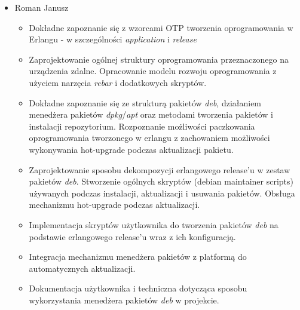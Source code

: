 \documentclass[polish,12pt]{aghthesis}
\begin{document}
\begin{itemize}
  \item Roman Janusz
  \begin{itemize}
    \item Dokładne zapoznanie się z wzorcami OTP tworzenia oprogramowania w Erlangu - w szczególności \emph{application} i \emph{release}
    \item Zaprojektowanie ogólnej struktury oprogramowania przeznaczonego na urządzenia zdalne. Opracowanie modelu rozwoju oprogramowania z użyciem narzęcia \emph{rebar} i dodatkowych skryptów.
    \item Dokładne zapoznanie się ze strukturą pakietów \emph{deb}, działaniem menedżera pakietów \emph{dpkg}/\emph{apt} oraz metodami tworzenia pakietów i instalacji repozytorium. Rozpoznanie możliwości paczkowania oprogramowania tworzonego w erlangu z zachowaniem możliwości wykonywania hot-upgrade podczas aktualizacji pakietu.
    \item Zaprojektowanie sposobu dekompozycji erlangowego release'u w zestaw pakietów \emph{deb}. Stworzenie ogólnych skryptów (debian maintainer scripts) używanych podczas instalacji, aktualizacji i usuwania pakietów. Obsługa mechanizmu hot-upgrade podczas aktualizacji.
    \item Implementacja skryptów użytkownika do tworzenia pakietów \emph{deb} na podstawie erlangowego release'u wraz z ich konfiguracją.
    \item Integracja mechanizmu menedżera pakietów z platformą do automatycznych aktualizacji.
    \item Dokumentacja użytkownika i techniczna dotycząca sposobu wykorzystania menedżera pakietów \emph{deb} w projekcie.
  \end{itemize}


\end{itemize}
\end{document}
